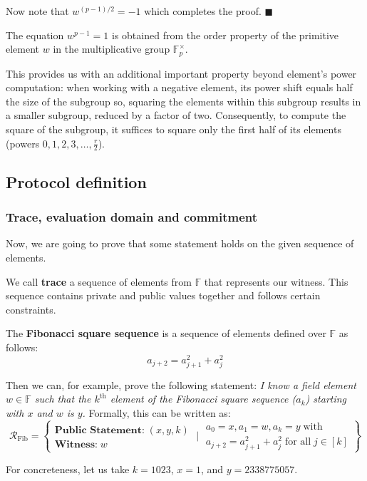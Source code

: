 \documentclass[../lecture-notes-148x210.tex]{subfiles}
\begin{document}
Now note that $w^{(p-1)/2} = -1$ which completes the proof. $\blacksquare$

\begin{remark}
The equation $w^{p - 1} = 1$ is obtained from the order property of the
primitive element $w$ in the multiplicative group $\mathbb{F}^{\times}_p$. 
\end{remark}
\begin{remark}
This provides us with an additional important property beyond element's power
computation: when working with a negative element, its power shift equals half
the size of the subgroup so, squaring the elements within this subgroup results
in a smaller subgroup, reduced by a factor of two. Consequently, to compute the
square of the subgroup, it suffices to square only the first half of its
elements (powers $0, 1, 2, 3, \dots, \frac{r}{2}$).
\end{remark}

\subsection{Protocol definition}

\subsubsection{Trace, evaluation domain and commitment}
Now, we are going to prove that some statement holds on the given sequence of elements.

\begin{definition}
We call \textbf{trace} a sequence of elements from $\mathbb{F}$ that represents our witness. This sequence contains private and public values together and follows certain constraints.
\end{definition}

\begin{example}
The \textbf{Fibonacci square sequence} is a sequence of elements defined over
$\mathbb{F}$ as follows: 
\begin{equation*}
a_{j+2} = a_{j+1}^2 + a_{j}^2  
\end{equation*}

Then we can, for example, prove the following statement: \textcolor{blue!60!black}{\textit{I know a field
element $w \in \mathbb{F}$ such that the $k^{\text{th}}$ element of the Fibonacci
square sequence ($a_k$) starting with $x$ and $w$ is $y$.}} Formally,
this can be written as:
\begin{equation*}
    \mathcal{R}_{\text{Fib}} = \left\{ \begin{matrix}
        \textbf{Public Statement:} \; (x, y, k) \\
        \textbf{Witness:} \; w  
    \end{matrix} \;\Big|\;  \begin{matrix}
        a_0 = x, a_1 = w, a_k = y \; \text{with} \\ a_{j+2} = a_{j+1}^2 + a_j^2 \; \text{for all} \; j \in [k] 
    \end{matrix}    
    \right\}
\end{equation*} 

For concreteness, let us take $k=1023$, $x = 1$, and $y=2338775057$.
\end{example}
\end{document}
